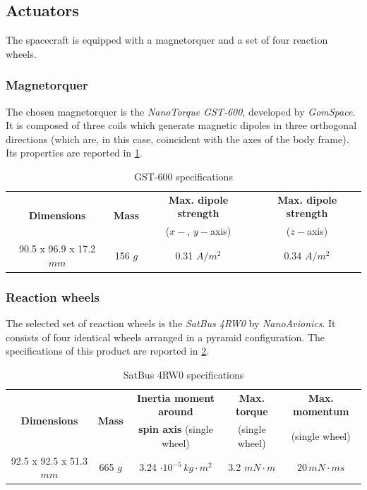 \subsection{Actuators}

The spacecraft is equipped with a magnetorquer and a set of four reaction wheels.

\subsubsection{Magnetorquer}

The chosen magnetorquer is the \textit{NanoTorque GST-600}, developed by \textit{GomSpace}. It is composed of three coils which generate magnetic dipoles in three orthogonal directions (which are, in this case, coincident with the axes of the body frame). Its properties are reported in \cref{tab:magnetorquer}.

\begin{table}[h]
    \centering
    \caption{GST-600 specifications \cite{magnetorquer}}
    \begin{tabular}{cccc}
    \toprule
    \toprule
    \multirow{2}{*}{\textbf{Dimensions}} & \multirow{2}{*}{\textbf{Mass}} & \textbf{Max. dipole strength} & \textbf{Max. dipole strength} \\
    & & ($x-$, $y-$axis) & ($z-$axis) \\
    \midrule
    90.5 x 96.9 x 17.2 $mm$ & 156 $g$ & 0.31 $A/m^2$ & 0.34 $A/m^2$ \\
    \bottomrule
    \bottomrule
    \end{tabular}
    \label{tab:magnetorquer}
\end{table}

\subsubsection{Reaction wheels}

The selected set of reaction wheels is the \textit{SatBus 4RW0} by \textit{NanoAvionics}. It consists of four identical wheels arranged in a pyramid configuration. The specifications of this product are reported in \cref{tab:reaction_wheels}.

\begin{table}[h]
    \centering
    \caption{SatBus 4RW0 specifications}
    \begin{tabular}{ccccc}
    \toprule
    \toprule
    \multirow{2}{*}{\textbf{Dimensions}} & \multirow{2}{*}{\textbf{Mass}} & \textbf{Inertia moment around} & \textbf{Max. torque} & \textbf{Max. momentum} \\
    & & \textbf{spin axis} (single wheel) & (single wheel) &  (single wheel) \\
    \midrule
    92.5 x 92.5 x 51.3 $mm$ & 665 $g$ & 3.24 $\cdot 10^{-5}\,kg\cdot m^2$ & 3.2 $mN \cdot m$ & $20 \, mN \cdot ms$ \\
    \bottomrule
    \bottomrule
    \end{tabular}
    \label{tab:reaction_wheels}
\end{table}